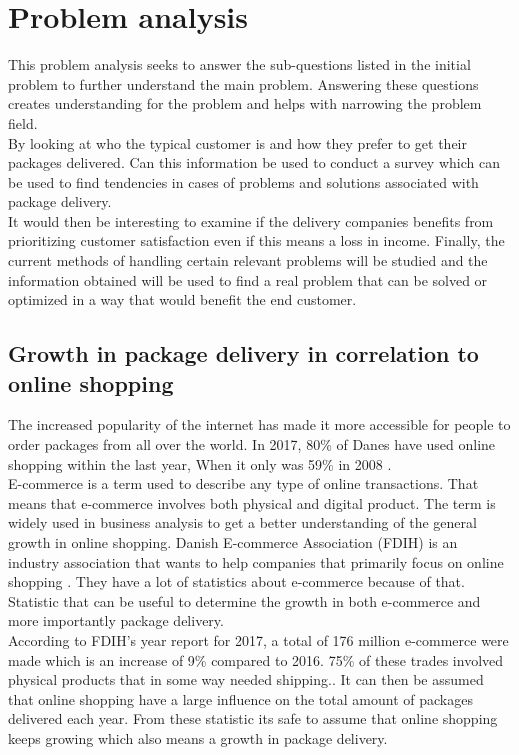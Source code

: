 \documentclass[12pt]{report}
\begin{document}
\chapter{Problem analysis}
This problem analysis seeks to answer the sub-questions listed in the initial problem to further understand the main problem. Answering these questions creates understanding for the problem and helps with narrowing the problem field. \\\hspace*{5 mm}
By looking at who the typical customer is and how they prefer to get their packages delivered. Can this information be used to conduct a survey which can be used to find tendencies in cases of problems and solutions associated with package delivery. \\\hspace*{5 mm}
It would then be interesting to examine if the delivery companies benefits from prioritizing customer satisfaction even if this means a loss in income. Finally, the current methods of handling certain relevant problems will be studied and the information obtained will be used to find a real problem that can be solved or optimized in a way that would benefit the end customer.




\section{Growth in package delivery in correlation to online shopping}
The increased popularity of the internet has made it more accessible for people to order packages from all over the world. In 2017, 80\% of Danes have used online shopping within the last year, When it only was 59\% in 2008 \cite{Ehandel2017}. \\\hspace*{5 mm}
E-commerce is a term used to describe any type of online transactions. That means that e-commerce involves both physical and digital product. The term is widely used in business analysis to get a better understanding of the general growth in online shopping. Danish E-commerce Association (FDIH) is an industry association that wants to help companies that primarily focus on online shopping \cite{fdihabout}. They have a lot of statistics about e-commerce because of that. Statistic that can be useful to determine the growth in both e-commerce and more importantly package delivery. \\\hspace*{5 mm}
According to FDIH's year report for 2017, a total of 176 million e-commerce were made which is an increase of 9\% compared to 2016. 75\% of these trades involved physical products that in some way needed shipping.\cite{FDIHyearreport}. It can then be assumed that online shopping have a large influence on the total amount of packages delivered each year.
From these statistic its safe to assume that online shopping keeps growing which also means a growth in package delivery.%
\end{document}

